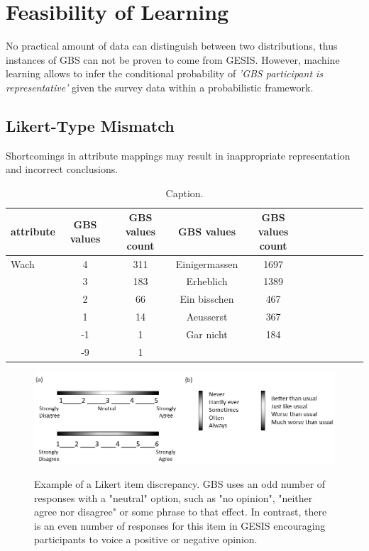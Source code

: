 \chapter{Feasibility of Learning}\label{Sec:Feasibility of Learning}

No practical amount of data can distinguish between two distributions, thus instances of GBS can not be proven to come from GESIS. However, machine learning allows to infer the conditional probability of \textit{'GBS participant is representative'} given the survey data within a probabilistic framework. 

\section{Likert-Type Mismatch}


Shortcomings in attribute mappings may result in inappropriate representation and incorrect conclusions.

\begin{table}[ht]
    \begin{center}
            {\footnotesize
            \begin{tabular}{l|c|ccccccccc}
                \hline \hline
		attribute & GBS values & GBS values count &  GBS values & GBS values count \\
                \hline \hline
                     Wach & 4 & 311 & Einigermassen & 1697 \\
                     & 3 & 183 & Erheblich & 1389 \\
                     & 2 & 66 & Ein bisschen & 467 \\ 
              	& 1 & 14 & Aeusserst & 367 \\	
		& -1 & 1 & Gar nicht & 184 \\		
		& -9 & 1 & & \\
            \end{tabular}}
        \caption{Caption.}
\end{center}
\end{table}


\begin{figure}[ht]
	\begin{center}
		\includegraphics[scale=0.50,angle=0]{fig/scales}
		\label{6_5}
		\caption{Example of a Likert item discrepancy. GBS uses an odd number of responses with a "neutral" option, such as "no opinion", "neither agree nor disagree" or some phrase to that effect. In contrast, there is an even number of responses for this item in GESIS encouraging participants to voice a positive or negative opinion.}
	\end{center}
\end{figure}


